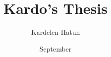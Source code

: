 \documentclass[10pt, b5paper, twoside]{memoir}
\begin{document}
 
\author{Kardelen Hatun} 
\title{Kardo's Thesis} 
\date{September} 

% 
% 
\mainmatter 
% 
% 
 
%



\backmatter 


\end{document}
